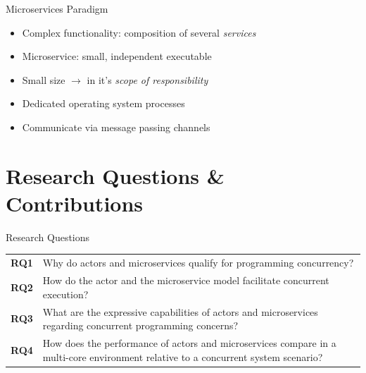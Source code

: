 \documentclass{beamer}
\begin{document}
\begin{frame}{Microservices Paradigm}

\begin{itemize}
  \item Complex functionality: composition of several \textit{services}
  \item Microservice: small, independent executable
  \item \glqq Small\grqq{} size $\rightarrow$ in it's \textit{scope of responsibility}
  \item Dedicated operating system processes
  \item Communicate via message passing channels
\end{itemize}

\end{frame}


\section{Research Questions \& Contributions}


\begin{frame}{Research Questions}

\begin{table}
  \begin{tabularx}{\textwidth}{lX}                                                                                                                    \\[10pt]%
    \textbf{RQ1} & Why do actors and microservices qualify for programming concurrency?                                                               \\[10pt]%
    \textbf{RQ2} & How do the actor and the microservice model facilitate concurrent execution?                                                       \\[10pt]%
    \textbf{RQ3} & What are the expressive capabilities of actors and microservices regarding concurrent programming concerns?                        \\[10pt]%
    \textbf{RQ4} & How does the performance of actors and microservices compare in a multi-core environment relative to a concurrent system scenario?
  \end{tabularx}
\end{table}

\end{frame}
\end{document}
